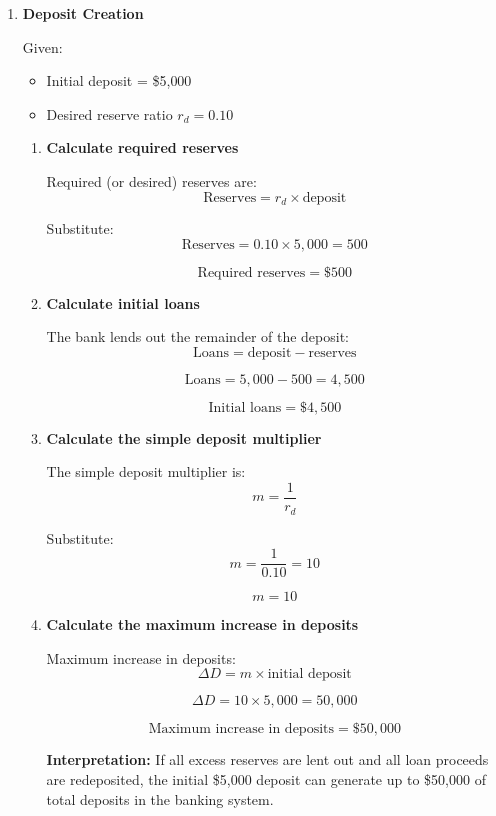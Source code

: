\documentclass[12pt]{article}
\begin{document}
\begin{enumerate}[label=\textbf{\arabic*.}, start=4]

\item \textbf{Deposit Creation}

Given:
\begin{itemize}
    \item Initial deposit = \$5{,}000
    \item Desired reserve ratio \(r_d = 0.10\)
\end{itemize}

\begin{enumerate}
    \item[(a)] \textbf{Calculate required reserves}

Required (or desired) reserves are:
\[
\text{Reserves} = r_d \times \text{deposit}
\]

Substitute:
\[
\text{Reserves} = 0.10 \times 5{,}000 = 500
\]

\[
\boxed{\text{Required reserves} = \$500}
\]

\item[(b)] \textbf{Calculate initial loans}

The bank lends out the remainder of the deposit:
\[
\text{Loans} = \text{deposit} - \text{reserves}
\]

\[
\text{Loans} = 5{,}000 - 500 = 4{,}500
\]

\[
\boxed{\text{Initial loans} = \$4{,}500}
\]

\item[(c)] \textbf{Calculate the simple deposit multiplier}

The simple deposit multiplier is:
\[
m = \frac{1}{r_d}
\]

Substitute:
\[
m = \frac{1}{0.10} = 10
\]

\[
\boxed{m = 10}
\]

\item[(d)] \textbf{Calculate the maximum increase in deposits}

Maximum increase in deposits:
\[
\Delta D = m \times \text{initial deposit}
\]

\[
\Delta D = 10 \times 5{,}000 = 50{,}000
\]

\[
\boxed{\text{Maximum increase in deposits} = \$50{,}000}
\]

\textbf{Interpretation:} If all excess reserves are lent out and all loan proceeds are redeposited, the initial \$5,000 deposit can generate up to \$50,000 of total deposits in the banking system.
\end{enumerate}


\end{enumerate}
\end{document}
